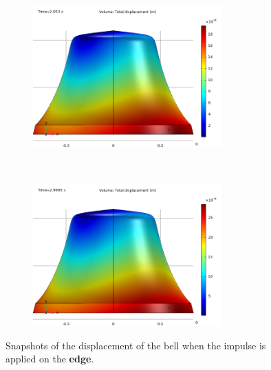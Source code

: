 \documentclass[a4paper]{article}
\begin{document}
\begin{figure}[h!]
	\begin{subfigure}{0.47\textwidth}
		\includegraphics[width=0.8\textwidth]{time domain study edge/middle time.png}
	\end{subfigure}
	~
	\begin{subfigure}{0.47\textwidth}
		\includegraphics[width=0.8\textwidth]{time domain study edge/final time.png}
	\end{subfigure}
	\caption{Snapshots of the displacement of the bell when the impulse is applied on the \textbf{edge}.}
	\label{fig:timeEdge}
\end{figure}
\end{document}
